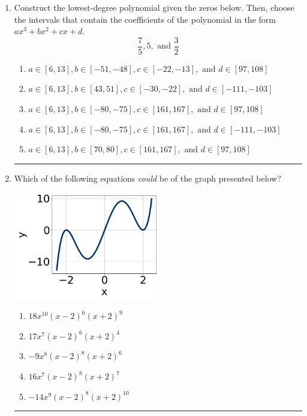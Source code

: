 \documentclass[14pt]{extbook}
\newcommand{\litem}[1]{\item#1\hspace*{-1cm}\rule{\textwidth}{0.4pt}}
\begin{document}
\begin{enumerate}
\litem{
Construct the lowest-degree polynomial given the zeros below. Then, choose the intervals that contain the coefficients of the polynomial in the form $ax^3+bx^2+cx+d$.\[ \frac{7}{5}, 5, \text{ and } \frac{3}{2} \]\begin{enumerate}[label=\Alph*.]
\item \( a \in [6, 13], b \in [-51, -48], c \in [-22, -13], \text{ and } d \in [97, 108] \)
\item \( a \in [6, 13], b \in [43, 51], c \in [-30, -22], \text{ and } d \in [-111, -103] \)
\item \( a \in [6, 13], b \in [-80, -75], c \in [161, 167], \text{ and } d \in [97, 108] \)
\item \( a \in [6, 13], b \in [-80, -75], c \in [161, 167], \text{ and } d \in [-111, -103] \)
\item \( a \in [6, 13], b \in [70, 80], c \in [161, 167], \text{ and } d \in [97, 108] \)

\end{enumerate} }
\litem{
Which of the following equations \textit{could} be of the graph presented below?
\begin{center}
    \includegraphics[width=0.5\textwidth]{../Figures/polyGraphToFunctionA.png}
\end{center}
\begin{enumerate}[label=\Alph*.]
\item \( 18x^{10} (x - 2)^{6} (x + 2)^{9} \)
\item \( 17x^{7} (x - 2)^{6} (x + 2)^{4} \)
\item \( -9x^{8} (x - 2)^{8} (x + 2)^{6} \)
\item \( 16x^{7} (x - 2)^{8} (x + 2)^{7} \)
\item \( -14x^{9} (x - 2)^{8} (x + 2)^{10} \)


\end{enumerate}}
\end{enumerate}
\end{document}
